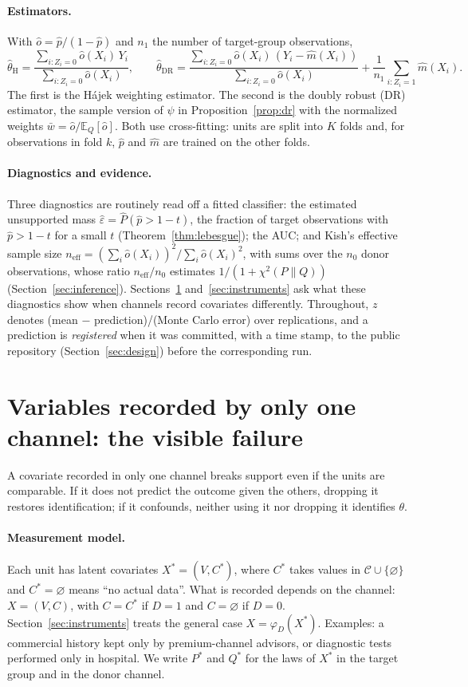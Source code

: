 \documentclass[twoside,11pt]{article}
\newcommand{\E}{\mathbb{E}}
\newcommand{\neff}{n_{\mathrm{eff}}}
\newcommand{\vacio}{\varnothing}
\theoremstyle{plain}
\theoremstyle{definition}
\begin{document}
\paragraph{Estimators.} With $\hat o=\hat p/(1-\hat p)$ and $n_1$ the number of target-group observations,
\[
\hat\theta_{\mathrm{H}}=\frac{\sum_{i:Z_i=0}\hat o(X_i)\,Y_i}{\sum_{i:Z_i=0}\hat o(X_i)},\qquad
\hat\theta_{\mathrm{DR}}=\frac{\sum_{i:Z_i=0}\hat o(X_i)\,(Y_i-\hat m(X_i))}{\sum_{i:Z_i=0}\hat o(X_i)}+\frac1{n_1}\sum_{i:Z_i=1}\hat m(X_i).
\]
The first is the Hájek weighting estimator. The second is the doubly robust (DR) estimator, the sample version of $\psi$ in Proposition~\ref{prop:dr} with the normalized weights $\bar w=\hat o/\E_Q[\hat o]$. Both use cross-fitting: units are split into $K$ folds and, for observations in fold $k$, $\hat p$ and $\hat m$ are trained on the other folds.

\paragraph{Diagnostics and evidence.} Three diagnostics are routinely read off a fitted classifier: the estimated unsupported mass $\hat\varepsilon=\hat P(\hat p>1-t)$, the fraction of target observations with $\hat p>1-t$ for a small $t$ (Theorem~\ref{thm:lebesgue}); the AUC; and Kish's \citeyearpar{kish1965} effective sample size $\neff=(\sum_i\hat o(X_i))^2/\sum_i\hat o(X_i)^2$, with sums over the $n_0$ donor observations, whose ratio $\neff/n_0$ estimates $1/(1+\chi^2(P\|Q))$ (Section~\ref{sec:inference}). Sections~\ref{sec:channel} and~\ref{sec:instruments} ask what these diagnostics show when channels record covariates differently. Throughout, $z$ denotes (mean $-$ prediction)/(Monte Carlo error) over replications, and a prediction is \emph{registered} when it was committed, with a time stamp, to the public repository (Section~\ref{sec:design}) before the corresponding run.
\section{Variables recorded by only one channel: the visible failure}\label{sec:channel}

A covariate recorded in only one channel breaks support even if the units are comparable. If it does not predict the outcome given the others, dropping it restores identification; if it confounds, neither using it nor dropping it identifies $\theta$.

\paragraph{Measurement model.} Each unit has latent covariates $X^*=(V,C^*)$, where $C^*$ takes values in $\mathcal C\cup\{\vacio\}$ and $C^*=\vacio$ means ``no actual data''. What is recorded depends on the channel: $X=(V,C)$, with $C=C^*$ if $D=1$ and $C=\vacio$ if $D=0$. Section~\ref{sec:instruments} treats the general case $X=\varphi_D(X^*)$. Examples: a commercial history kept only by premium-channel advisors, or diagnostic tests performed only in hospital. We write $P^*$ and $Q^*$ for the laws of $X^*$ in the target group and in the donor channel.
\end{document}
